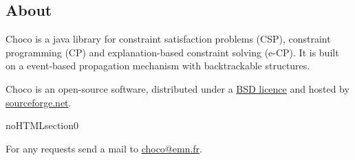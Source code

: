 \label{about}
\hypertarget{about}{}

\subsection*{About}\label{about:about}\hypertarget{about:about}{}

Choco is a java library for constraint satisfaction problems (CSP), constraint programming (CP) and explanation-based constraint solving (e-CP). It is built on a event-based propagation mechanism with backtrackable structures.

Choco is an open-source software, distributed under a \hyperlink{bsd_licence}{BSD licence} and hosted by \href{http://sourceforge.net/projects/choco/}{sourceforge.net}.

noHTMLsection0

For any requests send a mail to \url{choco@emn.fr}.
